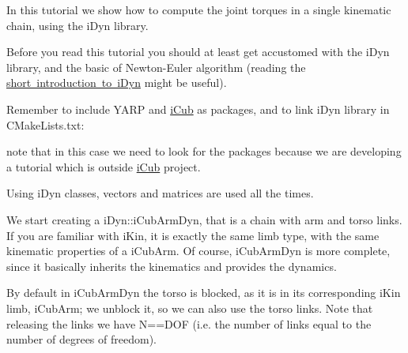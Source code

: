 In this tutorial we show how to compute the joint torques in a single kinematic chain, using the i\+Dyn library.

Before you read this tutorial you should at least get accustomed with the i\+Dyn library, and the basic of Newton-\/\+Euler algorithm (reading the \mbox{\hyperlink{idyn_introduction}{short introduction to i\+Dyn}} might be useful).

Remember to include YARP and \mbox{\hyperlink{namespaceiCub}{i\+Cub}} as packages, and to link i\+Dyn library in CMake\+Lists.\+txt\+: 
\begin{DoxyCode}{0}

\end{DoxyCode}
 note that in this case we need to look for the packages because we are developing a tutorial which is outside \mbox{\hyperlink{namespaceiCub}{i\+Cub}} project.

Using i\+Dyn classes, vectors and matrices are used all the times. 
\begin{DoxyCode}{0}
\DoxyCodeLine{\textcolor{preprocessor}{\#include <yarp/sig/Vector.h>}}
\DoxyCodeLine{\textcolor{preprocessor}{\#include <yarp/sig/Matrix.h>}}

\end{DoxyCode}


We start creating a i\+Dyn\+::i\+Cub\+Arm\+Dyn, that is a chain with arm and torso links. If you are familiar with i\+Kin, it is exactly the same limb type, with the same kinematic properties of a i\+Cub\+Arm. Of course, i\+Cub\+Arm\+Dyn is more complete, since it basically inherits the kinematics and provides the dynamics. 
\begin{DoxyCode}{0}

\end{DoxyCode}


By default in i\+Cub\+Arm\+Dyn the torso is blocked, as it is in its corresponding i\+Kin limb, i\+Cub\+Arm; we unblock it, so we can also use the torso links. Note that releasing the links we have N==DOF (i.\+e. the number of links equal to the number of degrees of freedom). 
\begin{DoxyCode}{0}

\end{DoxyCode}


